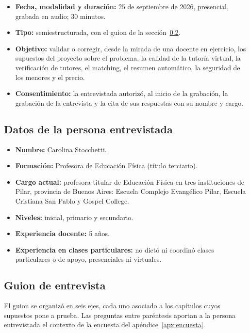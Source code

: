 \begin{itemize}
    \item \textbf{Fecha, modalidad y duración:} 25 de septiembre de 2026,
          presencial, grabada en audio; 30 minutos.
    \item \textbf{Tipo:} semiestructurada, con el guion de la
          sección~\ref{sec:guion-perfil1}.
    \item \textbf{Objetivo:} validar o corregir, desde la mirada de una
          docente en ejercicio, los supuestos del proyecto sobre el
          problema, la calidad de la tutoría virtual, la verificación de
          tutores, el \gls{matching}, el resumen automático, la seguridad
          de los menores y el precio.
    \item \textbf{Consentimiento:} la entrevistada autorizó, al inicio de
          la grabación, la grabación de la entrevista y la cita de sus
          respuestas con su nombre y cargo.
\end{itemize}

\subsection{Datos de la persona entrevistada}

\begin{itemize}
    \item \textbf{Nombre:} Carolina Stocchetti.
    \item \textbf{Formación:} Profesora de Educación Física (título
          terciario).
    \item \textbf{Cargo actual:} profesora titular de Educación Física en
          tres instituciones de Pilar, provincia de Buenos Aires: Escuela
          Complejo Evangélico Pilar, Escuela Cristiana San Pablo y Gospel
          College.
    \item \textbf{Niveles:} inicial, primario y secundario.
    \item \textbf{Experiencia docente:} 5 años.
    \item \textbf{Experiencia en clases particulares:} no dictó ni
          coordinó clases particulares o de apoyo, presenciales ni
          virtuales.
\end{itemize}

\subsection{Guion de entrevista}\label{sec:guion-perfil1}

El guion se organizó en seis ejes, cada uno asociado a los capítulos cuyos
supuestos pone a prueba. Las preguntas entre paréntesis aportan a la
persona entrevistada el contexto de la encuesta del
apéndice~\ref{apx:encuesta}.

